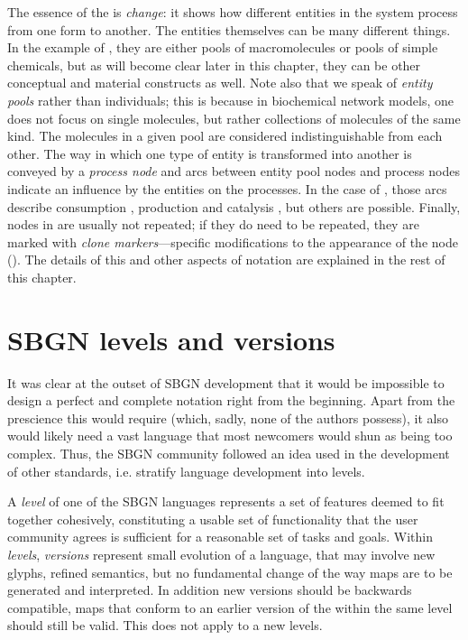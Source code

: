 The essence of the \PDs is \emph{change}: it shows how different entities in the system process from one form to another.  The entities themselves can be many different things.  In the example of , they are either pools of macromolecules or pools of simple chemicals, but as will become clear later in this chapter, they can be other conceptual and material constructs as well.  Note also that we speak of \emph{entity pools} rather than individuals; this is because in biochemical network models, one does not focus on single molecules, but rather collections of molecules of the same kind.  The molecules in a given pool are considered indistinguishable from each other.  The way in which one type of entity is transformed into another is conveyed by a \emph{process node} and arcs between entity pool nodes and process nodes indicate an influence by the entities on the processes.  In the case of , those arcs describe consumption , production  and catalysis , but others are possible.  Finally, nodes in \PDs are usually not repeated; if they do need to be repeated, they are marked with \emph{clone markers}---specific modifications to the appearance of the node (). The details of this and other aspects of \PD notation are explained in the rest of this chapter.

\section{SBGN levels and versions}
\label{sec:sbgn-levels}

It was clear at the outset of SBGN development that it would be impossible to design a perfect and complete notation right from the beginning.  Apart from the prescience this would require (which, sadly, none of the authors possess), it also would likely need a vast language that most newcomers would shun as being too complex.  Thus, the SBGN community followed an idea used in the development of other standards, i.e. stratify language development into levels.

A \emph{level} of one of the SBGN languages represents a set of features deemed to fit together cohesively, constituting a usable set of functionality that the user community agrees is sufficient for a reasonable set of tasks and goals.  Within \emph{levels}, \emph{versions} represent small evolution of a language, that may involve new glyphs, refined semantics, but no fundamental change of the way maps are to be generated and interpreted. In addition new versions should be backwards compatible, \ie \PD maps that conform to an earlier version of the \PDl within the same level should still be valid.  This does not apply to a new levels. 

